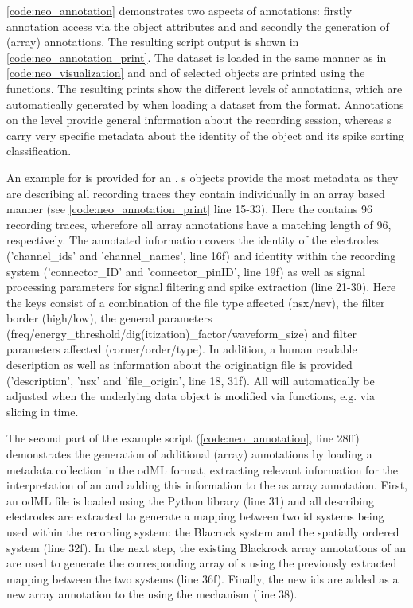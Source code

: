 \cref{code:neo_annotation} demonstrates two aspects of  annotations: firstly annotation access via the object attributes  and  and secondly the generation of (array) annotations. The resulting script output is shown in \cref{code:neo_annotation_print}. The dataset is loaded in the same manner as in \cref{code:neo_visualization} and  and  of selected objects are printed using the  functions. The resulting prints show the different levels of annotations, which are automatically generated by  when loading a dataset from the  format. Annotations on the  level provide general information about the recording session, whereas s carry very specific metadata about the identity of the object and its spike sorting classification.

An example for  is provided for an . s objects provide the most metadata as they are describing all recording traces they contain individually in an array based manner (see \cref{code:neo_annotation_print} line 15-33). Here the  contains 96 recording traces, wherefore all array annotations have a matching length of 96, respectively. The annotated information covers the identity of the electrodes ('channel\_ids' and 'channel\_names', line 16f) and identity within the recording system ('connector\_ID' and 'connector\_pinID', line 19f) as well as signal processing parameters for signal filtering and spike extraction (line 21-30). Here the keys consist of a combination of the file type affected (nsx/nev), the filter border (high/low), the general parameters (freq/energy\_threshold/dig(itization)\_factor/waveform\_size) and filter parameters affected (corner/order/type). In addition, a human readable description as well as information about the originatign file is provided ('description', 'nsx' and 'file\_origin', line 18, 31f). All  will automatically be adjusted when the underlying data object is modified via  functions, e.g. via slicing in time.

The second part of the example script (\cref{code:neo_annotation}, line 28ff) demonstrates the generation of additional (array) annotations by loading a metadata collection in the odML format, extracting relevant information for the interpretation of an  and adding this information to the  as array annotation. First, an odML file is loaded using the Python  library (line 31) and all  describing electrodes are extracted to generate a mapping between two id systems being used within the recording system: the Blacrock  system and the spatially ordered  system (line 32f). In the next step, the existing Blackrock  array annotations of an  are used to generate the corresponding array of s using the previously extracted mapping between the two systems (line 36f). Finally, the new ids are added as a new array annotation to the  using the  mechanism (line 38).

